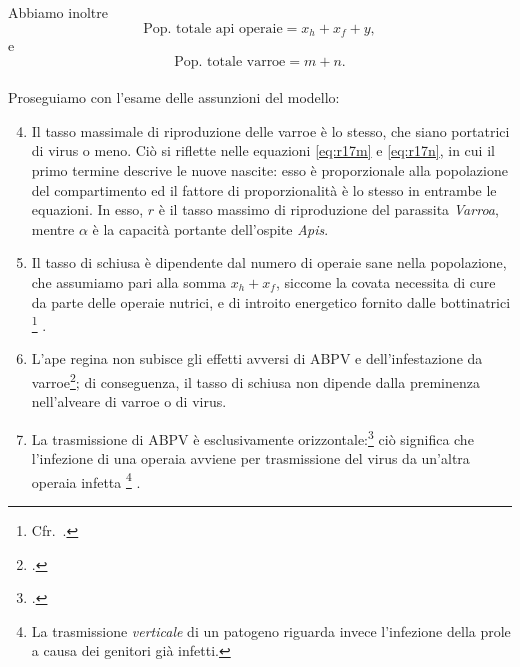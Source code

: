Abbiamo inoltre
$$\text{Pop. totale api operaie} = x_h + x_f + y,$$
e
$$\text{Pop. totale varroe} = m + n.$$

\paragraph{}
Proseguiamo con l'esame delle assunzioni del modello:
\begin{enumerate}
    \setcounter{enumi}{3}
    \item Il tasso massimale di riproduzione delle varroe è lo stesso, che siano portatrici di virus o meno.
    Ciò si riflette nelle equazioni \eqref{eq:r17m} e \eqref{eq:r17n}, in cui il primo termine descrive le nuove nascite: esso è proporzionale alla popolazione del compartimento ed il fattore di proporzionalità è lo stesso in entrambe le equazioni. In esso, $r$ è il tasso massimo di riproduzione del parassita \emph{Varroa}, mentre $\alpha$ è la capacità portante dell'ospite \emph{Apis}.
    \item Il tasso di schiusa è dipendente dal numero di operaie sane nella popolazione, che assumiamo pari alla somma
    $x_h + x_f$, siccome la covata necessita di cure da parte delle operaie nutrici, e di introito energetico fornito
    dalle bottinatrici
    \footnote{Cfr.~\cite{khoury2011}.}
    .
    \item L'ape regina non subisce gli effetti avversi di ABPV e dell'infestazione da varroe\footcite{privFDL}; di conseguenza, il tasso di schiusa non dipende dalla preminenza nell'alveare di varroe o di virus.
    \item La trasmissione di ABPV è esclusivamente orizzontale:\footcite{privFDL}
    ciò significa che l'infezione di una operaia avviene per trasmissione del virus da un'altra operaia infetta
    \footnote{La trasmissione \emph{verticale} di un patogeno riguarda invece l'infezione della prole a causa dei genitori già infetti.}
    .


\end{enumerate}
